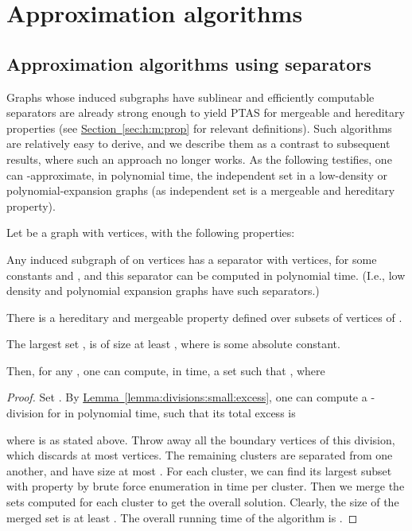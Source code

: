 \documentclass[12pt]{article}
\newcommand{\Term}[1]{\textsf{#1}}
\theoremstyle{remark}\theoremheaderfont{\sf}\theorembodyfont{\upshape}
\numberwithin{figure}{section}\numberwithin{table}{section}\numberwithin{equation}{section}
\newcommand{\HLink}[2]{\hyperref[#2]{#1~\ref*{#2}}}
\newcommand{\HLinkPage}[2]{\hyperref[#2]{#1~\ref*{#2}}}
\newcommand{\seclab}[1]{\label{sec:#1}} \newcommand{\secref}[1]{\HLink{Section}{sec:#1}} \newcommand{\secrefpage}[1]{\HLinkPage{Section}{sec:#1}}
\newcommand{\lemlab}[1]{\label{lemma:#1}}
\newcommand{\lemref}[1]{\HLink{Lemma}{lemma:#1}}
\newcommand{\PTAS}{\Term{PTAS}\xspace}
\begin{document}
\section{Approximation algorithms}
\seclab{approx:algorithms}

\subsection{Approximation algorithms using separators}
\seclab{approx:v:separators}

Graphs whose induced subgraphs have sublinear and efficiently
computable separators are already strong enough to yield \PTAS for
mergeable and hereditary properties (see \secref{h:m:prop} for
relevant definitions). Such algorithms are relatively easy to derive,
and we describe them as a contrast to subsequent results, where such
an approach no longer works. As the following testifies, one can
-approximate, in polynomial time, the independent set in a
low-density or polynomial-expansion graphs (as independent set is a
mergeable and hereditary property).

\begin{lemma}
  \lemlab{ptas:h:prop}Let  be a graph with  vertices, with the following
  properties: \smallskip \begin{compactenum}[\quad(A)]
  \item Any induced subgraph of  on  vertices has a
    separator with  vertices, for some
    constants  and , and this separator can
    be computed in polynomial time. (I.e., low density and polynomial
    expansion graphs have such separators.)

  \item There is a hereditary and mergeable property  defined
    over subsets of vertices of .

  \item The largest set , is of size at least ,
    where  is some absolute constant.
  \end{compactenum}\smallskip Then, for any , one can compute, in
   time, a set
   such that
  , where
  
\end{lemma}

\begin{proof}
  Set . By \lemref{divisions:small:excess}, one can
  compute a -division for  in polynomial time, such
  that its total excess is
  
  where  is as stated above.  Throw away all the boundary
  vertices of this division, which discards at most
   vertices. The remaining clusters
  are separated from one another, and have size at most . For
  each cluster, we can find its largest subset with property 
  by brute force enumeration in 
  time per cluster.  Then we merge the sets computed for each cluster
  to get the overall solution. Clearly, the size of the merged set is
  at least .  The
  overall running time of the algorithm is
  .
\end{proof}
\end{document}
